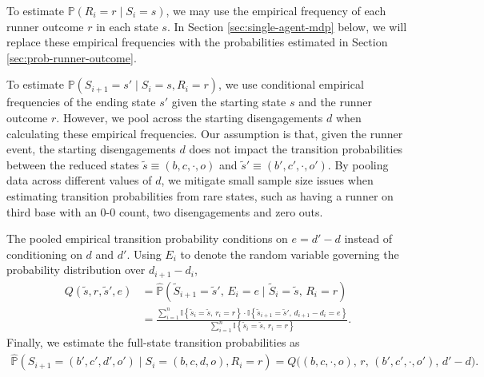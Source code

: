 \documentclass{article}
\begin{document}
        To estimate $\mathbb{P}(R_i = r \mid S_i = s)$, we may use the empirical frequency of each runner outcome $r$ in each state $s$. In Section \ref{sec:single-agent-mdp} below, we will replace these empirical frequencies with the probabilities estimated in Section \ref{sec:prob-runner-outcome}.
        
        To estimate $\mathbb{P}(S_{i+1} = s' \mid S_i = s, R_i = r)$, we use conditional empirical frequencies of the ending state $s'$ given the starting state $s$ and the runner outcome $r$. However, we pool across the starting disengagements $d$ when calculating these empirical frequencies. Our assumption is that, given the runner event, the starting disengagements $d$ does not impact the transition probabilities between the reduced states $\tilde s \equiv (b, c, \cdot, o)$ and $\tilde s' \equiv (b', c', \cdot, o')$. By pooling data across different values of $d$, we mitigate small sample size issues when estimating transition probabilities from rare states, such as having a runner on third base with an 0-0 count, two disengagements and zero outs.
        
        The pooled empirical transition probability conditions on $e = d' - d$ instead of conditioning on $d$ and $d'$. Using $E_{i}$ to denote the random variable governing the probability distribution over $d_{i + 1} - d_i$,
        \begin{align*}
          Q(\tilde s, r, \tilde s', e)
            &= \hat{\mathbb{P}}\left(\tilde S_{i+1} = \tilde s',\, E_i = e \mid \tilde S_i = \tilde s,\, R_i = r\right)\\
            &= \frac
              {\sum_{i=1}^n\mathbb{I}\left\{\tilde s_i = \tilde s,\, r_i = r\right\} \cdot \mathbb{I}\left\{\tilde s_{i+1} = \tilde s',\, d_{i+1} - d_i = e\right\}}
              {\sum_{i=1}^n\mathbb{I}\left\{\tilde s_i = \tilde s,\, r_i = r\right\}}.
        \end{align*}
        Finally, we estimate the full-state transition probabilities as
        \begin{align*}
          \hat{\mathbb{P}}(S_{i+1} = (b', c', d', o') \mid S_i = (b, c, d, o), R_i = r) = Q\big((b, c, \cdot, o),\, r,\, (b', c', \cdot, o'),\, d' - d\big).
        \end{align*}
\end{document}
